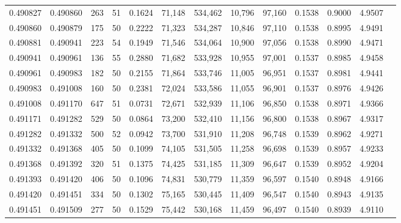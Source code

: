 \begin{tabular}{rrrrrrrrrrrrr}
0.490827 & 0.490860 & 263 &  51 &                                     0.1624 &  71,148 & 534,462 &  10,796 &  97,160 & 0.1538 & 0.9000 & 4.9507 \\
0.490860 & 0.490879 & 175 &  50 &                                     0.2222 &  71,323 & 534,287 &  10,846 &  97,110 & 0.1538 & 0.8995 & 4.9491 \\
0.490881 & 0.490941 & 223 &  54 &                                     0.1949 &  71,546 & 534,064 &  10,900 &  97,056 & 0.1538 & 0.8990 & 4.9471 \\
0.490941 & 0.490961 & 136 &  55 &                                     0.2880 &  71,682 & 533,928 &  10,955 &  97,001 & 0.1537 & 0.8985 & 4.9458 \\
0.490961 & 0.490983 & 182 &  50 &                                     0.2155 &  71,864 & 533,746 &  11,005 &  96,951 & 0.1537 & 0.8981 & 4.9441 \\
0.490983 & 0.491008 & 160 &  50 &                                     0.2381 &  72,024 & 533,586 &  11,055 &  96,901 & 0.1537 & 0.8976 & 4.9426 \\
0.491008 & 0.491170 & 647 &  51 &                                     0.0731 &  72,671 & 532,939 &  11,106 &  96,850 & 0.1538 & 0.8971 & 4.9366 \\
0.491171 & 0.491282 & 529 &  50 &                                     0.0864 &  73,200 & 532,410 &  11,156 &  96,800 & 0.1538 & 0.8967 & 4.9317 \\
0.491282 & 0.491332 & 500 &  52 &                                     0.0942 &  73,700 & 531,910 &  11,208 &  96,748 & 0.1539 & 0.8962 & 4.9271 \\
0.491332 & 0.491368 & 405 &  50 &                                     0.1099 &  74,105 & 531,505 &  11,258 &  96,698 & 0.1539 & 0.8957 & 4.9233 \\
0.491368 & 0.491392 & 320 &  51 &                                     0.1375 &  74,425 & 531,185 &  11,309 &  96,647 & 0.1539 & 0.8952 & 4.9204 \\
0.491393 & 0.491420 & 406 &  50 &                                     0.1096 &  74,831 & 530,779 &  11,359 &  96,597 & 0.1540 & 0.8948 & 4.9166 \\
0.491420 & 0.491451 & 334 &  50 &                                     0.1302 &  75,165 & 530,445 &  11,409 &  96,547 & 0.1540 & 0.8943 & 4.9135 \\
0.491451 & 0.491509 & 277 &  50 &                                     0.1529 &  75,442 & 530,168 &  11,459 &  96,497 & 0.1540 & 0.8939 & 4.9110 \\

\end{tabular}
